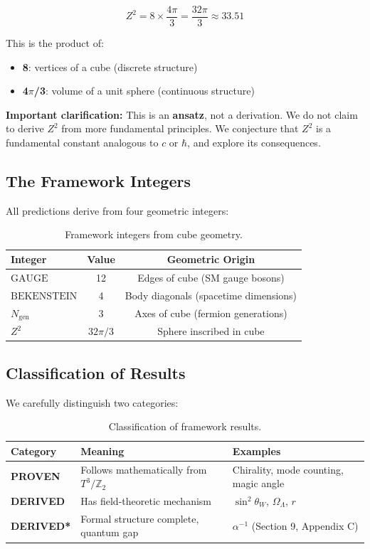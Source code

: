 \documentclass[12pt,a4paper]{article}
\newcommand{\Ztwo}{\mathbb{Z}_2}
\newcommand{\Tthree}{T^3}
\newcommand{\OmegaL}{\Omega_\Lambda}
\newcommand{\sinW}{\sin^2\theta_W}
\newcommand{\Zsq}{Z^2}
\newcommand{\GAUGE}{\text{GAUGE}}
\newcommand{\BEKENSTEIN}{\text{BEKENSTEIN}}
\newcommand{\Ngen}{N_{\text{gen}}}
\begin{document}
\begin{equation}
\boxed{\Zsq = 8 \times \frac{4\pi}{3} = \frac{32\pi}{3} \approx 33.51}
\end{equation}

This is the product of:
\begin{itemize}
    \item \textbf{8}: vertices of a cube (discrete structure)
    \item \textbf{4$\pi$/3}: volume of a unit sphere (continuous structure)
\end{itemize}

\textbf{Important clarification:} This is an \textbf{ansatz}, not a derivation. We do not claim to derive $\Zsq$ from more fundamental principles. We conjecture that $\Zsq$ is a fundamental constant analogous to $c$ or $\hbar$, and explore its consequences.

\subsection{The Framework Integers}

All predictions derive from four geometric integers:

\begin{table}[H]
\centering
\begin{tabular}{lcc}
\toprule
\textbf{Integer} & \textbf{Value} & \textbf{Geometric Origin} \\
\midrule
$\GAUGE$ & 12 & Edges of cube (SM gauge bosons) \\
$\BEKENSTEIN$ & 4 & Body diagonals (spacetime dimensions) \\
$\Ngen$ & 3 & Axes of cube (fermion generations) \\
$\Zsq$ & $32\pi/3$ & Sphere inscribed in cube \\
\bottomrule
\end{tabular}
\caption{Framework integers from cube geometry.}
\label{tab:integers}
\end{table}

\subsection{Classification of Results}

We carefully distinguish two categories:

\begin{table}[H]
\centering
\begin{tabular}{lll}
\toprule
\textbf{Category} & \textbf{Meaning} & \textbf{Examples} \\
\midrule
\textbf{PROVEN} & Follows mathematically from $\Tthree/\Ztwo$ & Chirality, mode counting, magic angle \\
\textbf{DERIVED} & Has field-theoretic mechanism & $\sinW$, $\OmegaL$, $r$ \\
\textbf{DERIVED*} & Formal structure complete, quantum gap & $\alpha^{-1}$ (Section 9, Appendix C) \\
\bottomrule
\end{tabular}
\caption{Classification of framework results.}
\end{table}
\end{document}
